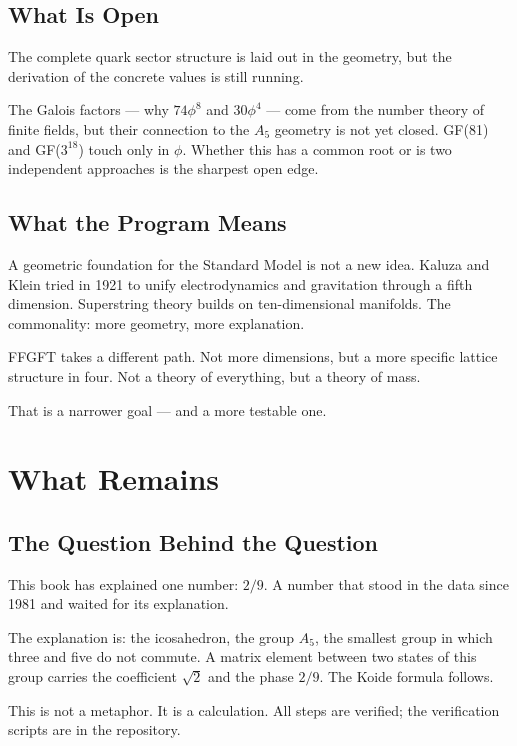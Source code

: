 \documentclass[12pt,oneside]{book}
\begin{document}
\section{What Is Open}

The complete quark sector structure is laid out in the geometry, but the derivation of the concrete values is still running.

The Galois factors --- why $74\phi^8$ and $30\phi^4$ --- come from the number theory of finite fields, but their connection to the $A_5$ geometry is not yet closed. GF(81) and GF($3^{18}$) touch only in $\phi$. Whether this has a common root or is two independent approaches is the sharpest open edge.

\section{What the Program Means}

A geometric foundation for the Standard Model is not a new idea. Kaluza and Klein tried in 1921 to unify electrodynamics and gravitation through a fifth dimension. Superstring theory builds on ten-dimensional manifolds. The commonality: more geometry, more explanation.

FFGFT takes a different path. Not more dimensions, but a more specific lattice structure in four. Not a theory of everything, but a theory of mass.

That is a narrower goal --- and a more testable one.

\chapter{What Remains}

\section{The Question Behind the Question}

This book has explained one number: $2/9$. A number that stood in the data since 1981 and waited for its explanation.

The explanation is: the icosa\-hedron, the group $A_5$, the smallest group in which three and five do not commute. A matrix element between two states of this group carries the coefficient $\sqrt{2}$ and the phase $2/9$. The Koide formula follows.

This is not a metaphor. It is a calculation. All steps are verified; the verification scripts are in the repository.
\end{document}
